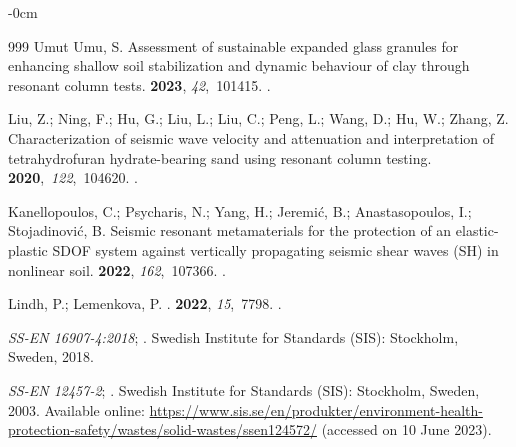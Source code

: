 \documentclass[sustainability,article,accept,pdftex,moreauthors]{Definitions/mdpi}
\begin{document}
{{\begin{adjustwidth}{-\extralength}{0cm}
\begin{thebibliography}{999}
{Umut Umu}, S.
\newblock Assessment of sustainable expanded glass granules for enhancing
  shallow soil stabilization and dynamic behaviour of clay through resonant
  column tests.
  {\bf 2023}, {\em 42},~101415.
.

Liu, Z.; Ning, F.; Hu, G.; Liu, L.; Liu, C.; Peng, L.; Wang, D.; Hu, W.; Zhang,
  Z.
\newblock Characterization of seismic wave velocity and attenuation and
  interpretation of tetrahydrofuran hydrate-bearing sand using resonant column
  testing.
 \mbox{{\bf 2020}, {\em 122},~104620.}
.

Kanellopoulos, C.; Psycharis, N.; Yang, H.; Jeremić, B.; Anastasopoulos, I.;
  Stojadinović, B.
\newblock Seismic resonant metamaterials for the protection of an
  elastic-plastic SDOF system against vertically propagating seismic shear
  waves (SH) in nonlinear soil.
 {\bf 2022}, {\em
  162},~107366.
.

Lindh, P.; Lemenkova, P.
.
 {\bf 2022}, {\em 15},~7798.
.

\emph{SS-EN 16907-4:2018};
.
\newblock Swedish Institute for Standards (SIS): {Stockholm, Sweden,}  2018.

 \emph{SS-EN 12457-2};
. Swedish Institute for Standards (SIS): {Stockholm, Sweden,}  2003.
\newblock
  Available online: \url{https://www.sis.se/en/produkter/environment-health-protection-safety/wastes/solid-wastes/ssen124572/} (accessed on 10 June 2023).


\end{thebibliography}
\end{adjustwidth}}}
\end{document}
